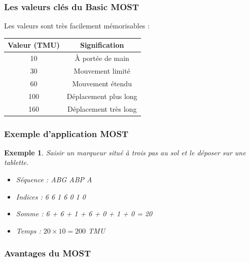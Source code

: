 \documentclass[a4paper,12pt]{article}
\newtheorem{exemple}{Exemple}[section]
\begin{document}
\subsubsection{Les valeurs clés du Basic MOST}

Les valeurs sont très facilement mémorisables :

\begin{center}
\begin{tabular}{|c|c|}
\hline
\textbf{Valeur (TMU)} & \textbf{Signification} \\
\hline
10 & À portée de main \\
30 & Mouvement limité \\
60 & Mouvement étendu \\
100 & Déplacement plus long \\
160 & Déplacement très long \\
\hline
\end{tabular}
\caption{Valeurs clés du Basic MOST}
\end{center}

\begin{center}
\end{center}

\subsubsection{Exemple d'application MOST}

\begin{exemple}
Saisir un marqueur situé à trois pas au sol et le déposer sur une tablette.

\begin{itemize}
    \item Séquence : ABG ABP A
    \item Indices : 6 6 1 6 0 1 0
    \item Somme : 6 + 6 + 1 + 6 + 0 + 1 + 0 = 20
    \item Temps : $20 \times 10 = 200$ TMU
\end{itemize}
\end{exemple}

\subsubsection{Avantages du MOST}
\end{document}
